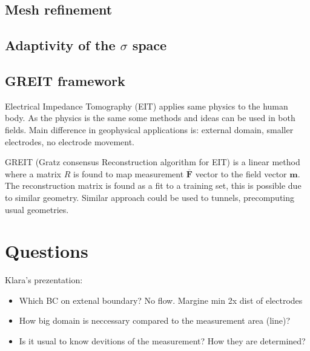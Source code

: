 \documentclass[a4paper, 12pt]{book}
\theoremstyle{definition}
\def\vc#1{\mathbf{\boldsymbol{#1}}}     %
\begin{document}
\subsection{Mesh refinement}

\subsection{Adaptivity of the $\sigma$ space}

\subsection{GREIT framework}
Electrical Impedance Tomography (EIT) applies same physics to the human body. As the physics is the same
some methods and ideas can be used in both fields. Main difference in geophysical applications is:
external domain, smaller electrodes, no electrode movement.

GREIT (Gratz consensus Reconstruction algorithm for EIT) is a linear method where a matrix $R$ is found to map measurement
$\overline{\vc F}$ vector to the field vector $\vc m$. The reconstruction matrix is found as a fit to a training set, this is possible
due to similar geometry. Similar approach could be used to tunnels, precomputing usual geometries.


\section{Questions}
Klara's prezentation:
\begin{itemize}
 \item Which BC on extenal boundary? No flow. Margine min 2x dist of electrodes
 \item How big domain is neccessary compared to the measurement area (line)?
 \item Is it usual to know devitions of the measurement? How they are determined?
\end{itemize}




\end{document}
